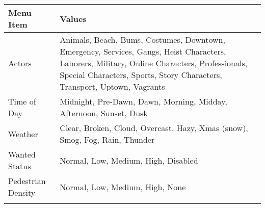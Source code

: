 \documentclass[
  openany]{book}
\begin{document}
\begin{longtable}[]{@{}ll@{}}
\toprule
\begin{minipage}[b]{0.47\columnwidth}\raggedright
Menu Item\strut
\end{minipage} & \begin{minipage}[b]{0.47\columnwidth}\raggedright
Values\strut
\end{minipage}\tabularnewline
\midrule
\endhead
\begin{minipage}[t]{0.47\columnwidth}\raggedright
Actors\strut
\end{minipage} & \begin{minipage}[t]{0.47\columnwidth}\raggedright
Animals, Beach, Bums, Costumes, Downtown, Emergency, Services, Gangs, Heist Characters, Laborers, Military, Online Characters, Professionals, Special Characters, Sports, Story Characters, Transport, Uptown, Vagrants\strut
\end{minipage}\tabularnewline
\begin{minipage}[t]{0.47\columnwidth}\raggedright
Time of Day\strut
\end{minipage} & \begin{minipage}[t]{0.47\columnwidth}\raggedright
Midnight, Pre-Dawn, Dawn, Morning, Midday, Afternoon, Sunset, Dusk\strut
\end{minipage}\tabularnewline
\begin{minipage}[t]{0.47\columnwidth}\raggedright
Weather\strut
\end{minipage} & \begin{minipage}[t]{0.47\columnwidth}\raggedright
Clear, Broken, Cloud, Overcast, Hazy, Xmas (snow), Smog, Fog, Rain, Thunder\strut
\end{minipage}\tabularnewline
\begin{minipage}[t]{0.47\columnwidth}\raggedright
Wanted Status\strut
\end{minipage} & \begin{minipage}[t]{0.47\columnwidth}\raggedright
Normal, Low, Medium, High, Disabled\strut
\end{minipage}\tabularnewline
\begin{minipage}[t]{0.47\columnwidth}\raggedright
Pedestrian Density\strut
\end{minipage} & \begin{minipage}[t]{0.47\columnwidth}\raggedright
Normal, Low, Medium, High, None\strut
\end{minipage}\tabularnewline
\begin{minipage}[t]{0.47\columnwidth}\raggedright

\end{minipage}
\end{longtable}
\end{document}
